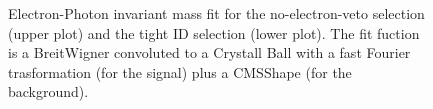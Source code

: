 \documentclass[12pt,oneandhalf,chaparabic,phys,ms,eng]{metu}
\begin{document}
\begin{figure}[!ht]
  \begin{center}
  \end{center}
    \caption{Electron-Photon invariant mass fit for the no-electron-veto selection (upper plot) and the tight ID selection (lower plot). The fit fuction is a BreitWigner convoluted to a Crystall Ball with a fast Fourier trasformation (for the signal) plus a CMSShape (for the background).}
    \label{Zmass_lepton}
\end{figure}
\end{document}
